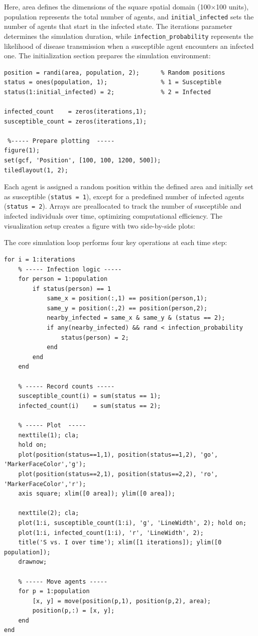 \documentclass{article}
\begin{document}
Here, area defines the dimensions of the square spatial domain (100×100 units), population represents the total number of agents, and \texttt{initial\_infected} sets the number of agents that start in the infected state. The iterations parameter determines the simulation duration, while \texttt{infection\_probability} represents the likelihood of disease transmission when a susceptible agent encounters an infected one.
The initialization section prepares the simulation environment:
\begin{lstlisting}[caption={Initialization}]
% ----- Initialization -----
position = randi(area, population, 2);      % Random positions
status = ones(population, 1);               % 1 = Susceptible
status(1:initial_infected) = 2;             % 2 = Infected

infected_count    = zeros(iterations,1);
susceptible_count = zeros(iterations,1);

 %----- Prepare plotting  -----
figure(1); 
set(gcf, 'Position', [100, 100, 1200, 500]);
tiledlayout(1, 2);

\end{lstlisting}

Each agent is assigned a random position within the defined area and initially set as susceptible (\texttt{status = 1}), except for a predefined number of infected agents (\texttt{status = 2}). Arrays are preallocated to track the number of susceptible and infected individuals over time, optimizing computational efficiency.
The visualization setup creates a figure with two side-by-side plots:

The core simulation loop performs four key operations at each time step:

\begin{lstlisting}[caption={Simulation loop}]
for i = 1:iterations
    % ----- Infection logic -----
    for person = 1:population
        if status(person) == 1
            same_x = position(:,1) == position(person,1);
            same_y = position(:,2) == position(person,2);
            nearby_infected = same_x & same_y & (status == 2);
            if any(nearby_infected) && rand < infection_probability
                status(person) = 2;
            end
        end
    end

    % ----- Record counts -----
    susceptible_count(i) = sum(status == 1);
    infected_count(i)    = sum(status == 2);

    % ----- Plot  -----
    nexttile(1); cla;
    hold on;
    plot(position(status==1,1), position(status==1,2), 'go', 'MarkerFaceColor','g');
    plot(position(status==2,1), position(status==2,2), 'ro', 'MarkerFaceColor','r');
    axis square; xlim([0 area]); ylim([0 area]);

    nexttile(2); cla;
    plot(1:i, susceptible_count(1:i), 'g', 'LineWidth', 2); hold on;
    plot(1:i, infected_count(1:i), 'r', 'LineWidth', 2);
    title('S vs. I over time'); xlim([1 iterations]); ylim([0 population]);
    drawnow;

    % ----- Move agents -----
    for p = 1:population
        [x, y] = move(position(p,1), position(p,2), area);
        position(p,:) = [x, y];
    end
end
\end{lstlisting}
\end{document}
